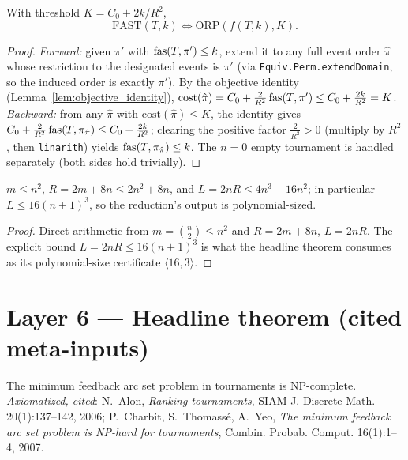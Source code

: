 \begin{lemma}
\label{lem:reduction_correct}
\leanok
{}
With threshold $K = C_0 + 2k/R^2$,
\[
  \mathrm{FAST}(T,k) \iff \mathrm{ORP}(f(T,k), K).
\]
\end{lemma}
\begin{proof}
\leanok
{}
\emph{Forward:} given $\pi'$ with $\operatorname{fas}(T,\pi') \le k$, extend it to any full
event order $\hat\pi$ whose restriction to the designated events is $\pi'$ (via
\texttt{Equiv.Perm.extendDomain}, so the induced order is exactly $\pi'$). By the
objective identity (Lemma~\ref{lem:objective_identity}),
$\mathrm{cost}(\hat\pi) = C_0 + \tfrac2{R^2}\operatorname{fas}(T,\pi') \le C_0 + \tfrac{2k}{R^2}
= K$.
\emph{Backward:} from any $\hat\pi$ with $\mathrm{cost}(\hat\pi) \le K$, the
identity gives $C_0 + \tfrac2{R^2}\operatorname{fas}(T,\pi_{\hat\pi}) \le C_0 + \tfrac{2k}{R^2}$;
clearing the positive factor $\tfrac2{R^2} > 0$ (multiply by $R^2$, then
\texttt{linarith}) yields $\operatorname{fas}(T,\pi_{\hat\pi}) \le k$. The $n = 0$ empty
tournament is handled separately (both sides hold trivially).
\end{proof}

\begin{lemma}
\label{lem:poly_size}
\leanok
{}
$m \le n^2$, $R = 2m + 8n \le 2n^2 + 8n$, and $L = 2nR \le 4n^3 + 16n^2$; in
particular $L \le 16(n+1)^3$, so the reduction's output is polynomial-sized.
\end{lemma}
\begin{proof}
\leanok
Direct arithmetic from $m = \binom n2 \le n^2$ and $R = 2m+8n$, $L = 2nR$. The
explicit bound $L = 2nR \le 16(n+1)^3$ is what the headline theorem consumes as
its polynomial-size certificate $\langle 16, 3\rangle$.
\end{proof}

\section{Layer 6 --- Headline theorem (cited meta-inputs)}

\begin{theorem}
\label{ax:fast_np_complete}
\leanok
The minimum feedback arc set problem in tournaments is NP-complete.
\emph{Axiomatized, cited}: N.~Alon, \emph{Ranking tournaments}, SIAM J. Discrete
Math. 20(1):137--142, 2006; P.~Charbit, S.~Thomass\'e, A.~Yeo, \emph{The minimum
feedback arc set problem is NP-hard for tournaments}, Combin. Probab. Comput.
16(1):1--4, 2007.
\end{theorem}

